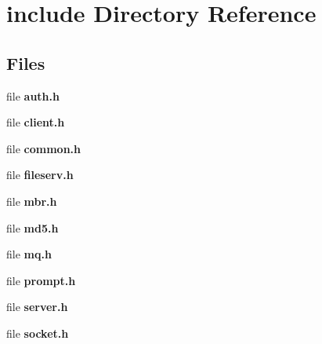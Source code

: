\section{include Directory Reference}
\label{dir_d44c64559bbebec7f509842c48db8b23}
\subsection*{Files}
\begin{DoxyCompactItemize}
\item 
file \textbf{ auth.\+h}
\item 
file \textbf{ client.\+h}
\item 
file \textbf{ common.\+h}
\item 
file \textbf{ fileserv.\+h}
\item 
file \textbf{ mbr.\+h}
\item 
file \textbf{ md5.\+h}
\item 
file \textbf{ mq.\+h}
\item 
file \textbf{ prompt.\+h}
\item 
file \textbf{ server.\+h}
\item 
file \textbf{ socket.\+h}
\end{DoxyCompactItemize}
